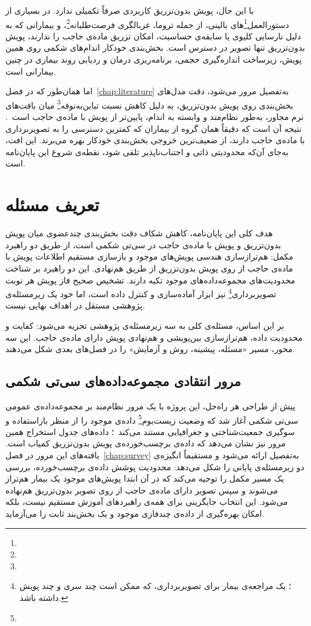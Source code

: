 با این حال، پویش بدون‌تزریق کاربردی صرفاً تکمیلی ندارد. در بسیاری از دستورالعمل\footnote{}‌های بالینی، از جمله تروما، غربالگری فرصت‌طلبانه\footnote{}، و بیمارانی که به دلیل نارسایی کلیوی یا سابقه‌ی حساسیت، امکان تزریق ماده‌ی حاجب را ندارند، پویش بدون‌تزریق تنها تصویر در دسترس است. بخش‌بندی خودکار اندام‌های شکمی روی همین پویش، زیرساخت اندازه‌گیری حجمی، برنامه‌ریزی درمان و ردیابی روند بیماری در چنین بیمارانی است.

اما همان‌طور که در فصل~\ref{chap:literature} به‌تفصیل مرور می‌شود، دقت مدل‌های بخش‌بندی روی پویش بدون‌تزریق، به دلیل کاهش نسبت تباین‌به‌نوفه\footnote{} میان بافت‌های نرم مجاور، به‌طور نظام‌مند و وابسته به اندام، پایین‌تر از پویش با ماده‌ی حاجب است~\cite{jeon2024fully,abel2025intraindividual,Zho24}. نتیجه آن است که دقیقاً همان گروه از بیماران که کمترین دسترسی را به تصویربرداری با ماده‌ی حاجب دارند، از ضعیف‌ترین خروجی بخش‌بندی خودکار بهره می‌برند. این افت، به‌جای آن‌که محدودیتی ذاتی و اجتناب‌ناپذیر تلقی شود، نقطه‌ی شروع این پایان‌نامه است.

\section{تعریف مسئله}
\label{sec:problem-definition}

هدف کلی این پایان‌نامه، کاهش شکاف دقت بخش‌بندی چندعضوی میان پویش بدون‌تزریق و پویش با ماده‌ی حاجب در سی‌تی شکمی است، از طریق دو راهبرد مکمل: هم‌ترازسازی هندسی پویش‌های موجود و بازسازی مستقیم اطلاعات پویش با ماده‌ی حاجب از روی پویش بدون‌تزریق از طریق هم‌نهادی. این دو راهبرد بر شناخت محدودیت‌های مجموعه‌داده‌های موجود تکیه دارند. تشخیص صحیح فاز پویش هر نوبت تصویربرداری\footnote{؛ یک مراجعه‌ی بیمار برای تصویربرداری، که ممکن است چند سری و چند پویش داشته باشد.} نیز ابزار آماده‌سازی و کنترل داده است، اما خود یک زیرمسئله‌ی پژوهشی مستقل در اهداف نهایی نیست.

بر این اساس، مسئله‌ی کلی به سه زیرمسئله‌ی پژوهشی تجزیه می‌شود: کفایت و محدودیت داده، هم‌ترازسازی بین‌پویشی و هم‌نهادی پویش دارای ماده‌ی حاجب. این سه محور، مسیر «مسئله، پیشینه، روش و آزمایش» را در فصل‌های بعدی شکل می‌دهند.

\subsection{مرور انتقادی مجموعه‌داده‌های سی‌تی شکمی}
\label{subsec:sp-datasets}

پیش از طراحی هر راه‌حل، این پروژه با یک مرور نظام‌مند بر  مجموعه‌داده‌ی عمومی سی‌تی شکمی آغاز شد که وضعیت زیست‌بوم\footnote{} داده‌ی موجود را از منظر بازاستفاده و سوگیری جمعیت‌شناختی و جغرافیایی مستند می‌کند~\cite{danaei2026abdomenctreview}؛ داده‌های جدول استخراج همین مرور نیز نشان می‌دهد که داده‌ی برچسب‌خورده‌ی پویش بدون‌تزریق کمیاب است. یافته‌های این مرور در فصل~\ref{chap:survey} به‌تفصیل ارائه می‌شود و مستقیماً انگیزه‌ی دو زیرمسئله‌ی پایانی را شکل می‌دهد: محدودیت پوشش داده‌ی برچسب‌خورده، بررسی یک مسیر مکمل را توجیه می‌کند که در آن ابتدا پویش‌های موجود یک بیمار هم‌تراز می‌شوند و سپس تصویر دارای ماده‌ی حاجب از روی تصویر بدون‌تزریق هم‌نهاده می‌شود. این انتخاب جایگزینی برای همه‌ی راهبردهای آموزش مستقیم نیست، بلکه امکان بهره‌گیری از داده‌ی چندفازی موجود و یک بخش‌بند ثابت را می‌آزماید.

